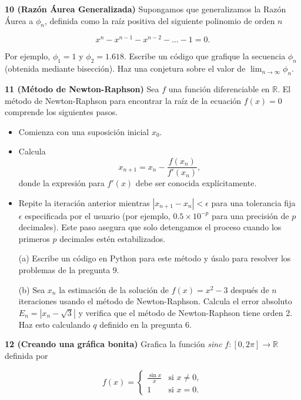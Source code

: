 \documentclass{article}
\begin{document}
\textbf{10 (Razón Áurea Generalizada)} Supongamos que generalizamos la Razón Áurea a \(\phi_n\), definida como la raíz positiva del siguiente polinomio de orden \(n\)

\[
x^n - x^{n-1} - x^{n-2} - \dots - 1 = 0.
\]

Por ejemplo, \(\phi_1 = 1\) y \(\phi_2 = 1.618\).  
Escribe un código que grafique la secuencia \(\phi_n\) (obtenida mediante bisección). Haz una conjetura sobre el valor de \(\lim_{n \to \infty} \phi_n\).

\textbf{11 (Método de Newton-Raphson)} Sea \(f\) una función diferenciable en \(\mathbb{R}\). El método de Newton-Raphson para encontrar la raíz de la ecuación \(f(x) = 0\) comprende los siguientes pasos.

\begin{itemize}
    \item Comienza con una suposición inicial \(x_0\).
    \item Calcula
    \[
    x_{n+1} = x_n - \frac{f(x_n)}{f'(x_n)},
    \]
    donde la expresión para \(f'(x)\) debe ser conocida explícitamente.
    \item Repite la iteración anterior mientras \(|x_{n+1} - x_n| < \epsilon\) para una tolerancia fija \(\epsilon\) especificada por el usuario (por ejemplo, \(0.5 \times 10^{-p}\) para una precisión de \(p\) decimales). Este paso asegura que solo detengamos el proceso cuando los primeros \(p\) decimales estén estabilizados.
\end{itemize}

\begin{itemize}
    \item[(a)] Escribe un código en Python para este método y úsalo para resolver los problemas de la pregunta 9.
    
    \item[(b)] Sea \(x_n\) la estimación de la solución de \(f(x) = x^2 - 3\) después de \(n\) iteraciones usando el método de Newton-Raphson.  
    Calcula el error absoluto \(E_n = |x_n - \sqrt{3}|\) y verifica que el método de Newton-Raphson tiene orden 2. Haz esto calculando \(q\) definido en la pregunta 6.
\end{itemize}

\textbf{12 (Creando una gráfica bonita)} Grafica la función \textit{sinc} \(f : [0, 2\pi] \to \mathbb{R}\) definida por

\[
f(x) = 
\begin{cases} 
\frac{\sin x}{x} & \text{si } x \neq 0, \\
1 & \text{si } x = 0.
\end{cases}
\]
\end{document}
